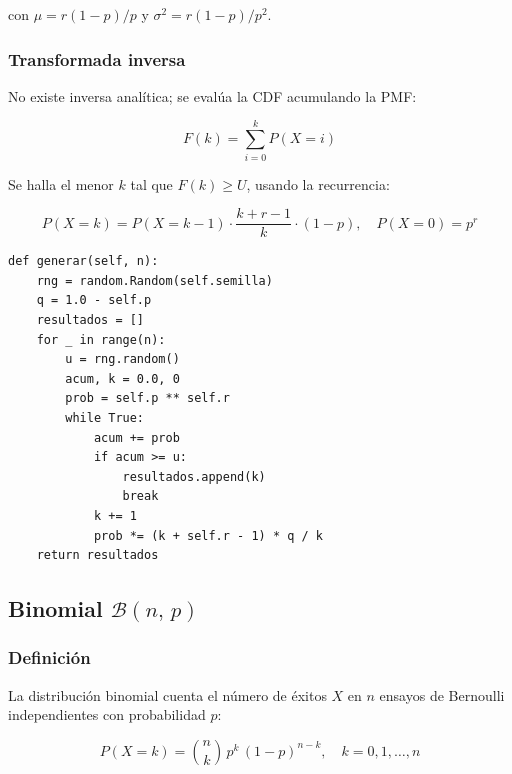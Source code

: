 \documentclass[a4paper, 11pt]{article}
\begin{document}
con $\mu = r(1-p)/p$ y $\sigma^2 = r(1-p)/p^2$.

\subsubsection*{Transformada inversa}

No existe inversa analítica; se evalúa la CDF acumulando la PMF:

\begin{equation}
  F(k) = \sum_{i=0}^{k} P(X = i)
\end{equation}

Se halla el menor $k$ tal que $F(k) \geq U$, usando la recurrencia:

\begin{equation}
  P(X = k) = P(X = k-1)\cdot\frac{k + r - 1}{k}\cdot(1-p), \quad P(X=0) = p^r
  \label{eq:pascal_rec}
\end{equation}

\begin{lstlisting}[style=python, caption={Generador Pascal — transformada inversa con recurrencia.}]
def generar(self, n):
    rng = random.Random(self.semilla)
    q = 1.0 - self.p
    resultados = []
    for _ in range(n):
        u = rng.random()
        acum, k = 0.0, 0
        prob = self.p ** self.r
        while True:
            acum += prob
            if acum >= u:
                resultados.append(k)
                break
            k += 1
            prob *= (k + self.r - 1) * q / k
    return resultados
\end{lstlisting}


\subsection{Binomial \texorpdfstring{$\mathcal{B}(n,\,p)$}{B(n,p)}}

\subsubsection*{Definición}

La distribución binomial cuenta el número de éxitos $X$ en $n$ ensayos de
Bernoulli independientes con probabilidad $p$:

\begin{equation}
  P(X = k) = \binom{n}{k}\,p^k\,(1-p)^{n-k}, \quad k = 0,1,\ldots,n
  \label{eq:binom_pmf}
\end{equation}
\end{document}
